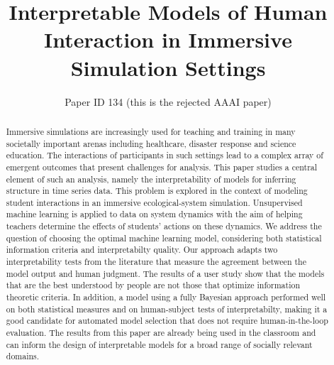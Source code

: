 \documentclass[letterpaper]{article} %
\title{Interpretable Models of Human Interaction in Immersive Simulation Settings}
\author{Paper ID 134 (this is the rejected AAAI paper)}
\begin{document}
\maketitle


\begin{abstract}
Immersive simulations are increasingly used for teaching and training in many societally important arenas including healthcare, disaster response and science education.
The interactions of participants in such settings lead to a complex array of emergent  outcomes that present challenges for analysis.
This paper studies a central element of such an analysis, namely the interpretability of models for inferring structure in time series data.
This problem is explored in the context of modeling student interactions in an immersive ecological-system simulation.
Unsupervised machine learning is applied to data on system dynamics with the aim of helping teachers determine the effects of students' actions on these dynamics.
We address the question of choosing the optimal machine learning model, considering both statistical information criteria and interpretabilty quality.
Our approach adapts two interpretability tests from the literature that measure the agreement between the model output and human judgment.
The results of a user study show that the models that are  the best understood by  people are not those that optimize information theoretic criteria.
In addition, a model using a fully Bayesian approach performed well on both statistical measures and on human-subject tests of interpretabilty, making it a good candidate for automated model selection that does not require human-in-the-loop evaluation.
The results from this paper are already being used in the classroom and can inform the design of interpretable models for a broad range of socially relevant domains.
\end{abstract}
\end{document}
